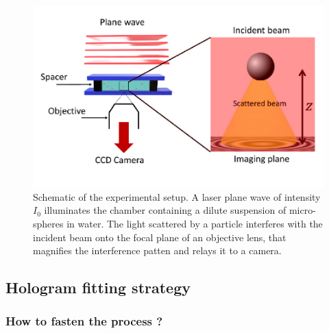 \begin{figure}[h!]
	\centering
	\includegraphics[scale=0.9]{02_body/chapter2/images/figures_setup/schema_setup.pdf}
	\caption{Schematic of the experimental setup. A laser plane wave of intensity $I_0$ illuminates the chamber containing a dilute suspension of micro-spheres in water. The light scattered by a particle interferes with the incident beam onto the focal plane of an objective lens, that magnifies the interference patten and relays it to a camera.}
	\label{fig:schema}
\end{figure}


\subsection{Hologram fitting strategy}

\subsubsection{How to fasten the process ?}

